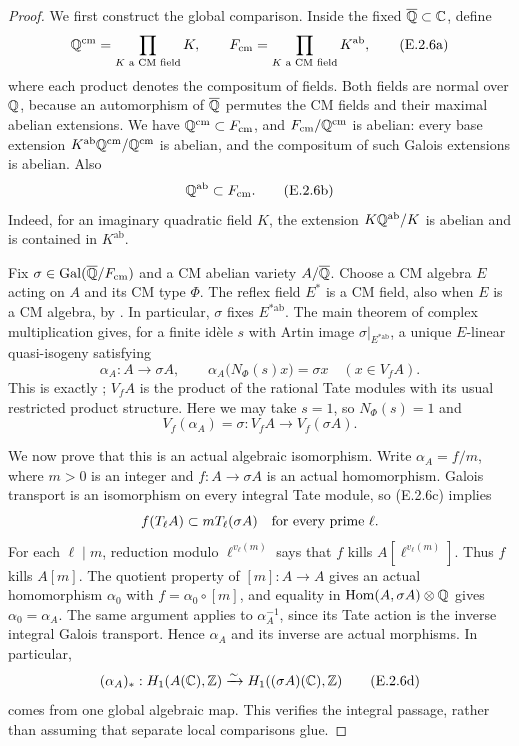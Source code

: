 \begin{proof}
We first construct the global comparison. Inside the fixed $\overline{\mathbb Q}\subset\mathbb C$, define
\[
 \mathbb Q^{\mathrm{cm}}=\prod_{K\text{ a CM field}}K,
 \qquad
 F_{\mathrm{cm}}=\prod_{K\text{ a CM field}}K^{\mathrm{ab}},
 \tag{E.2.6a}
\]
where each product denotes the compositum of fields. Both fields are normal over $\mathbb Q$, because an automorphism of $\overline{\mathbb Q}$ permutes the CM fields and their maximal abelian extensions. We have $\mathbb Q^{\mathrm{cm}}\subset F_{\mathrm{cm}}$, and $F_{\mathrm{cm}}/\mathbb Q^{\mathrm{cm}}$ is abelian: every base extension $K^{\mathrm{ab}}\mathbb Q^{\mathrm{cm}}/\mathbb Q^{\mathrm{cm}}$ is abelian, and the compositum of such Galois extensions is abelian. Also
\[
 \mathbb Q^{\mathrm{ab}}\subset F_{\mathrm{cm}}.
 \tag{E.2.6b}
\]
Indeed, for an imaginary quadratic field $K$, the extension $K\mathbb Q^{\mathrm{ab}}/K$ is abelian and is contained in $K^{\mathrm{ab}}$.

Fix $\sigma\in\operatorname{Gal}(\overline{\mathbb Q}/F_{\mathrm{cm}})$ and a CM abelian variety $A/\overline{\mathbb Q}$. Choose a CM algebra $E$ acting on $A$ and its CM type $\Phi$. The reflex field $E^*$ is a CM field, also when $E$ is a CM algebra, by \cite[Proposition 1.18, p.~14]{GenMilneCM2020}. In particular, $\sigma$ fixes $E^{*\mathrm{ab}}$. The main theorem of complex multiplication gives, for a finite id\`ele $s$ with Artin image $\sigma|_{E^{*\mathrm{ab}}}$, a unique $E$-linear quasi-isogeny satisfying
\[
 \alpha_A:A\longrightarrow\sigma A,
 \qquad
 \alpha_A\bigl(N_\Phi(s)x\bigr)=\sigma x
          \quad(x\in V_f A).
\]
This is exactly \cite[Theorem 9.10, p.~78]{GenMilneCM2020}; $V_f A$ is the product of the rational Tate modules with its usual restricted product structure. Here we may take $s=1$, so $N_\Phi(s)=1$ and
\[
 V_f(\alpha_A)=\sigma:V_f A\longrightarrow V_f(\sigma A).
 \tag{E.2.6c}
\]

We now prove that this is an actual algebraic isomorphism. Write $\alpha_A=f/m$, where $m>0$ is an integer and $f:A\to\sigma A$ is an actual homomorphism. Galois transport is an isomorphism on every integral Tate module, so (E.2.6c) implies
\[
 f(T_\ell A)\subset mT_\ell(\sigma A)
                         \quad\hbox{for every prime }\ell.
\]
For each $\ell\mid m$, reduction modulo $\ell^{v_\ell(m)}$ says that $f$ kills $A[\ell^{v_\ell(m)}]$. Thus $f$ kills $A[m]$. The quotient property of $[m]:A\to A$ gives an actual homomorphism $\alpha_0$ with $f=\alpha_0\circ[m]$, and equality in $\operatorname{Hom}(A,\sigma A)\otimes\mathbb Q$ gives $\alpha_0=\alpha_A$. The same argument applies to $\alpha_A^{-1}$, since its Tate action is the inverse integral Galois transport. Hence $\alpha_A$ and its inverse are actual morphisms. In particular,
\[
 (\alpha_A)_*:H_1(A(\mathbb C),\mathbb Z)\xrightarrow{\sim}
                         H_1((\sigma A)(\mathbb C),\mathbb Z)
 \tag{E.2.6d}
\]
comes from one global algebraic map. This verifies the integral passage, rather than assuming that separate local comparisons glue.


\end{proof}
